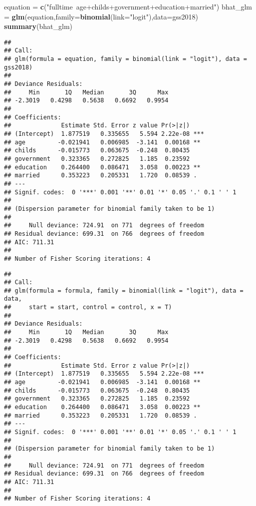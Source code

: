 \documentclass[
]{article}
\newenvironment{Shaded}{\begin{snugshade}}{\end{snugshade}}
\newcommand{\DataTypeTok}[1]{\textcolor[rgb]{0.13,0.29,0.53}{#1}}
\newcommand{\KeywordTok}[1]{\textcolor[rgb]{0.13,0.29,0.53}{\textbf{#1}}}
\newcommand{\NormalTok}[1]{#1}
\newcommand{\OperatorTok}[1]{\textcolor[rgb]{0.81,0.36,0.00}{\textbf{#1}}}
\newcommand{\StringTok}[1]{\textcolor[rgb]{0.31,0.60,0.02}{#1}}
\begin{document}
\begin{Shaded}
\begin{Highlighting}[]
\NormalTok{equation =}\StringTok{ }\KeywordTok{c}\NormalTok{(}\StringTok{"fulltime~age+childs+government+education+married"}\NormalTok{)}
\NormalTok{bhat_glm =}\StringTok{ }\KeywordTok{glm}\NormalTok{(equation,}\DataTypeTok{family=}\KeywordTok{binomial}\NormalTok{(}\DataTypeTok{link=}\StringTok{"logit"}\NormalTok{),}\DataTypeTok{data=}\NormalTok{gss2018)}
\KeywordTok{summary}\NormalTok{(bhat_glm)}
\end{Highlighting}
\end{Shaded}

\begin{verbatim}
## 
## Call:
## glm(formula = equation, family = binomial(link = "logit"), data = gss2018)
## 
## Deviance Residuals: 
##     Min       1Q   Median       3Q      Max  
## -2.3019   0.4298   0.5638   0.6692   0.9954  
## 
## Coefficients:
##              Estimate Std. Error z value Pr(>|z|)    
## (Intercept)  1.877519   0.335655   5.594 2.22e-08 ***
## age         -0.021941   0.006985  -3.141  0.00168 ** 
## childs      -0.015773   0.063675  -0.248  0.80435    
## government   0.323365   0.272825   1.185  0.23592    
## education    0.264400   0.086471   3.058  0.00223 ** 
## married      0.353223   0.205331   1.720  0.08539 .  
## ---
## Signif. codes:  0 '***' 0.001 '**' 0.01 '*' 0.05 '.' 0.1 ' ' 1
## 
## (Dispersion parameter for binomial family taken to be 1)
## 
##     Null deviance: 724.91  on 771  degrees of freedom
## Residual deviance: 699.31  on 766  degrees of freedom
## AIC: 711.31
## 
## Number of Fisher Scoring iterations: 4
\end{verbatim}

\begin{Shaded}
\end{Shaded}

\begin{verbatim}
## 
## Call:
## glm(formula = formula, family = binomial(link = "logit"), data = data, 
##     start = start, control = control, x = T)
## 
## Deviance Residuals: 
##     Min       1Q   Median       3Q      Max  
## -2.3019   0.4298   0.5638   0.6692   0.9954  
## 
## Coefficients:
##              Estimate Std. Error z value Pr(>|z|)    
## (Intercept)  1.877519   0.335655   5.594 2.22e-08 ***
## age         -0.021941   0.006985  -3.141  0.00168 ** 
## childs      -0.015773   0.063675  -0.248  0.80435    
## government   0.323365   0.272825   1.185  0.23592    
## education    0.264400   0.086471   3.058  0.00223 ** 
## married      0.353223   0.205331   1.720  0.08539 .  
## ---
## Signif. codes:  0 '***' 0.001 '**' 0.01 '*' 0.05 '.' 0.1 ' ' 1
## 
## (Dispersion parameter for binomial family taken to be 1)
## 
##     Null deviance: 724.91  on 771  degrees of freedom
## Residual deviance: 699.31  on 766  degrees of freedom
## AIC: 711.31
## 
## Number of Fisher Scoring iterations: 4
\end{verbatim}
\end{document}

